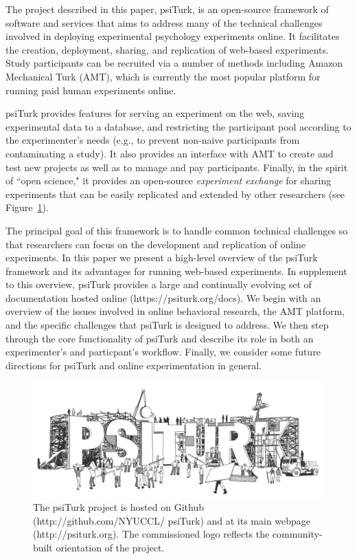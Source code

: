 \documentclass[twocolumn]{svjour3}          %
\begin{document}
The project described in this paper, \textsf{psiTurk}, is an open-source framework of 
software and services that aims to address many of the technical challenges
involved in deploying experimental psychology experiments online.
It facilitates the creation, deployment, sharing, and replication of web-based experiments.
Study participants can be recruited via a number of methods including Amazon 
Mechanical Turk (AMT), which is currently the most popular platform for running 
paid human experiments online.

\textsf{psiTurk} provides features for serving an experiment on the web, saving 
experimental data to a database, and restricting the participant pool according to 
the experimenter's needs (e.g., to prevent non-naive participants from contaminating
a study). It also provides an interface with AMT to create and test new projects as well as to 
manage and pay participants. Finally, in the spirit of ``open science," it provides 
an open-source \emph{experiment exchange} for sharing experiments that can be easily 
replicated and extended by other researchers (see Figure~\ref{fig:logo}).

The principal goal of this framework is to handle common technical 
challenges so that researchers can focus on the development and replication
of online experiments.  In this paper we present a high-level overview of the 
\textsf{psiTurk} framework and its advantages for running web-based experiments.
In supplement to this overview, \textsf{psiTurk} provides a large and continually
evolving set of documentation hosted online (https://psiturk.org/docs).
We begin with an overview of the issues involved in online behavioral research, 
the AMT platform, and the specific challenges that \textsf{psiTurk} is designed to address.  
We then  step through the core functionality of \textsf{psiTurk} and describe its role in both
an experimenter's and particpant's workflow.  Finally, we consider some future directions for 
\textsf{psiTurk} and online experimentation in general.


\begin{figure}[tp]
\centering
\includegraphics[scale=.35]{figures/psiturk_logo.jpg}
\caption{The \textsf{psiTurk} project is hosted on Github (http://github.com/NYUCCL/ psiTurk) and at its main webpage (http://psiturk.org). The commissioned logo reflects the community-built orientation of the project.}
\label{fig:logo}
\end{figure}
\end{document}
